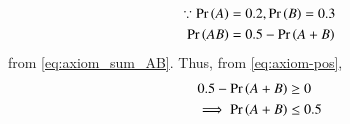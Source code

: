 \begin{align}
	\because \Pr\left(A\right)&=0.2,
\Pr\left(B\right)=0.3
\\
\Pr\left(AB\right)&= 0.5-\Pr\left(A+B\right)\\
\end{align}
from \eqref{eq:axiom_sum_AB}.  Thus, from 
	\eqref{eq:axiom-pos},
\begin{align}
	0.5-\Pr\left(A+B\right)&\ge 0\\
\implies\Pr\left(A+B\right) &\le 0.5
\end{align}

